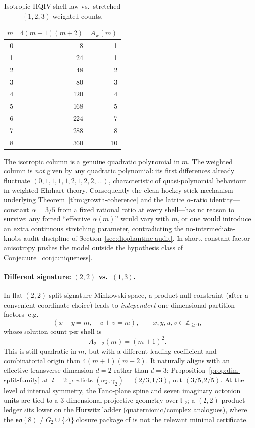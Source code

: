 \documentclass[11pt]{amsart}
\begin{document}
\begin{table}[ht]
\centering
\caption{Isotropic HQIV shell law vs.\ stretched \((1,2,3)\)-weighted counts.}
\label{tab:stretch}
\begin{tabular}{r|rr}
\(m\) & \(4(m+1)(m+2)\) & \(A_{\mathrm{w}}(m)\)\\\hline
0 & 8 & 1\\
1 & 24 & 1\\
2 & 48 & 2\\
3 & 80 & 3\\
4 & 120 & 4\\
5 & 168 & 5\\
6 & 224 & 7\\
7 & 288 & 8\\
8 & 360 & 10
\end{tabular}
\end{table}

The isotropic column is a genuine quadratic polynomial in \(m\). The weighted column is \emph{not} given by any quadratic polynomial: its first differences already fluctuate \((0,1,1,1,1,2,1,2,2,\dots)\), characteristic of quasi-polynomial behaviour in weighted Ehrhart theory. Consequently the clean hockey-stick mechanism underlying Theorem~\ref{thm:growth-coherence} and the \hyperref[lean:lattice-ratio]{lattice \(\alpha\)-ratio identity}---constant \(\alpha=3/5\) from a fixed rational ratio at every shell---has no reason to survive: any forced ``effective \(\alpha(m)\)'' would vary with \(m\), or one would introduce an extra continuous stretching parameter, contradicting the no-intermediate-knobs audit discipline of Section~\ref{sec:diophantine-audit}. In short, constant-factor anisotropy pushes the model outside the hypothesis class of Conjecture~\ref{conj:uniqueness}.

\paragraph{Different signature: \((2,2)\) vs.\ \((1,3)\).}
In flat \((2,2)\) split-signature Minkowski space, a product null constraint (after a convenient coordinate choice) leads to \emph{independent} one-dimensional partition factors, e.g.
\[
(x+y=m,\quad u+v=m),\qquad x,y,u,v\in\mathbb{Z}_{\ge 0},
\]
whose solution count per shell is
\[
A_{2+2}(m)=(m+1)^2.
\]
This is still quadratic in \(m\), but with a different leading coefficient and combinatorial origin than \(4(m+1)(m+2)\). It naturally aligns with an effective transverse dimension \(d=2\) rather than \(d=3\): Proposition~\ref{prop:dim-split-family} at \(d=2\) predicts \((\alpha_2,\gamma_2)=(2/3,1/3)\), not \((3/5,2/5)\). At the level of internal symmetry, the Fano-plane spine and seven imaginary octonion units are tied to a \(3\)-dimensional projective geometry over \(\mathbb{F}_2\); a \((2,2)\) product ledger sits lower on the Hurwitz ladder (quaternionic/complex analogues), where the \(\mathfrak{so}(8)\) / \(G_2\cup\{\Delta\}\) closure package of \cite{hqiv-so8-paper} is not the relevant minimal certificate.
\end{document}
